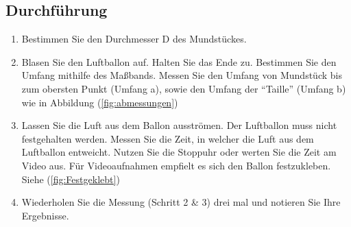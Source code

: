 \documentclass{article}
\begin{document}
    \subsection{Durchführung}
    \begin{enumerate} %
        \item Bestimmen Sie den Durchmesser D des Mundstückes.
        \item Blasen Sie den Luftballon auf. Halten Sie das Ende zu. Bestimmen Sie den Umfang mithilfe des Maßbands.
        Messen Sie den Umfang von Mundstück bis zum obersten Punkt (Umfang a), sowie den Umfang der \enquote{Taille} (Umfang b) wie in Abbildung (\ref{fig:abmessungen})
        \item Lassen Sie die Luft aus dem Ballon ausströmen. Der Luftballon muss nicht festgehalten werden.
        Messen Sie die Zeit, in welcher die Luft aus dem Luftballon entweicht.
        Nutzen Sie die Stoppuhr oder werten Sie die Zeit am Video aus. Für Videoaufnahmen empfielt es sich den Ballon festzukleben. Siehe (\ref{fig:Festgeklebt}) %
        \item Wiederholen Sie die Messung (Schritt 2 \& 3) drei mal und notieren Sie Ihre Ergebnisse.
    \end{enumerate}
\end{document}
